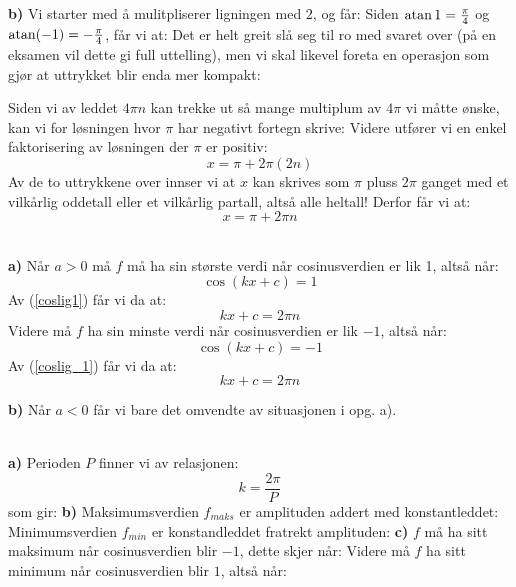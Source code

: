 \textbf{b)} Vi starter med å mulitpliserer ligningen med $ 2 $, og får:
Siden $ \operatorname{atan} 1 = \frac{\pi}{4} $ og $ \operatorname{atan} (-1) = -\frac{\pi}{4} $, får vi at:
Det er helt greit slå seg til ro med svaret over (på en eksamen vil dette gi full uttelling), men vi skal likevel foreta en operasjon som gjør at uttrykket blir enda mer kompakt:\vsk

Siden vi av leddet $ 4\pi n $ kan trekke ut så mange multiplum av $ 4\pi $ vi måtte ønske, kan vi for løsningen hvor $ \pi $ har negativt fortegn skrive:
Videre utfører vi en enkel faktorisering av løsningen der $ \pi $ er positiv:
\[ x=\pi+ 2\pi(2n) \]
Av de to uttrykkene over innser vi at $ x $ kan skrives som $ \pi $ pluss $ 2\pi $ ganget med et vilkårlig oddetall eller et vilkårlig partall, altså alle heltall! Derfor får vi at:
\[ x = \pi +2\pi n \]

\\
\textbf{a)} Når $ a>0 $ må $ f $ må ha sin største verdi når cosinusverdien er lik 1, altså når:
\[ \cos(kx + c) = 1 \]
Av (\ref{coslig1}) får vi da at:
\[ kx +c = 2\pi n \]
Videre må $ f $ ha sin minste verdi når cosinusverdien er lik $ -1 $, altså når:
\[ \cos(kx + c) = -1 \]
Av (\ref{coslig_1}) får vi da at:
\[ kx +c = 2\pi n \]

\textbf{b)} Når $ a<0 $ får vi bare det omvendte av situasjonen i opg. a).\vsk

\\
\textbf{a)}
Perioden $ P $ finner vi av relasjonen:
\[ k = \frac{2\pi}{P}  \]
som gir:
\textbf{b)} Maksimumsverdien $ f_{maks} $ er amplituden addert med konstantleddet:
Minimumsverdien $ f_{min} $ er konstandleddet fratrekt amplituden:
\textbf{c)} $ f $ må ha sitt maksimum når cosinusverdien blir $ -1 $, dette skjer når:
Videre må $ f $ ha sitt minimum når cosinusverdien blir $ 1 $, altså når:

